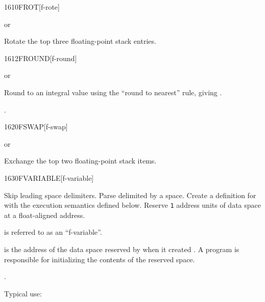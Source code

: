\begin{worddef}{1610}{FROT}[f-rote]
\item {} or

	Rotate the top three floating-point stack entries.
\end{worddef}


\begin{worddef}{1612}{FROUND}[f-round]
\item {} or

	Round  to an integral value using the ``round to nearest''
	rule, giving .

	\begin{see}
		.
	\end{see}
\end{worddef}


\begin{worddef}{1620}{FSWAP}[f-swap]
\item {} or

	Exchange the top two floating-point stack items.
\end{worddef}


\begin{worddef}{1630}{FVARIABLE}[f-variable]
\item {}

	Skip leading space delimiters. Parse  delimited by a
	space. Create a definition for  with the execution
	semantics defined below. Reserve \texttt{1} 
	address units of data space at a float-aligned address.

	 is referred to as an ``f-variable''.

\execute[name]

	 is the address of the data space reserved by
	 when it created . A program is
	responsible for initializing the contents of the reserved
	space.

\see {}.

	\begin{rationale} %
		Typical use:
			 
	\end{rationale}
\end{worddef}



